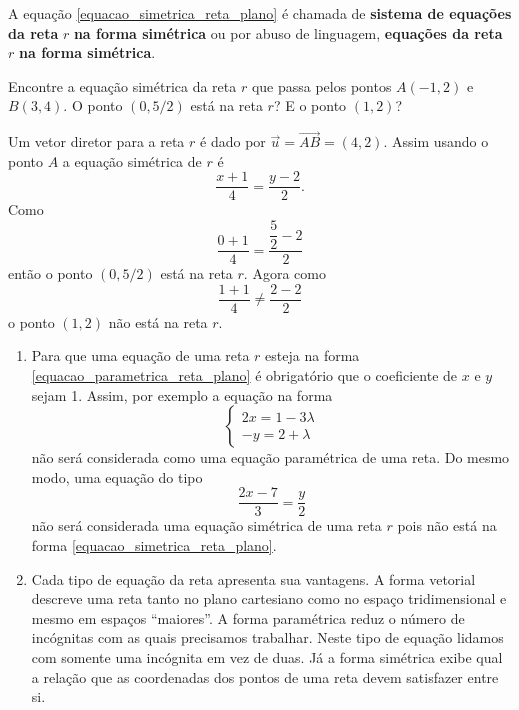 \begin{definicao}
    A equação \eqref{equacao_simetrica_reta_plano} é chamada de \textbf{sistema de equações da reta} $r$ \textbf{na forma simétrica} ou por abuso de linguagem, \textbf{equações da reta} $r$ \textbf{na forma simétrica}.
\end{definicao}

\begin{exemplos}
    Encontre a equação simétrica da reta $r$ que passa pelos pontos $A(-1,2)$ e $B(3,4)$. O ponto $(0,5/2)$ está na reta $r$? E o ponto $(1,2)$?
    \begin{solucao}
        Um vetor diretor para a reta $r$ é dado por $\vec{u} = \vec{AB} = (4,2)$. Assim usando o ponto $A$ a equação simétrica de $r$ é
        \[
            \dfrac{x + 1}{4} = \dfrac{y - 2}{2}.
        \]
        Como
        \[
            \dfrac{0 + 1}{4} = \dfrac{\dfrac{5}{2} - 2}{2}
        \]
        então o ponto $(0,5/2)$ está na reta $r$. Agora como
        \[
            \dfrac{1+1}{4} \ne \dfrac{2 - 2}{2}
        \]
        o ponto $(1, 2)$ não está na reta $r$.

    \end{solucao}
\end{exemplos}

\begin{observacao}
    \begin{enumerate}
        \item Para que uma equação de uma reta $r$ esteja na forma \eqref{equacao_parametrica_reta_plano} é obrigatório que o coeficiente de $x$ e $y$ sejam 1. Assim, por exemplo a equação na forma
              \[
                  \begin{cases}
                      2x = 1 - 3\lambda \\
                      -y = 2 + \lambda
                  \end{cases}
              \]
              não será considerada como uma equação paramétrica de uma reta. Do mesmo modo, uma equação do tipo
              \[
                  \dfrac{2x - 7}{3} = \dfrac{y}{2}
              \]
              não será considerada uma equação simétrica de uma reta $r$ pois não está na forma \eqref{equacao_simetrica_reta_plano}.

        \item Cada tipo de equação da reta apresenta sua vantagens. A forma vetorial descreve uma reta tanto no plano cartesiano como no espaço tridimensional e mesmo em espaços ``maiores''. A forma paramétrica reduz o número de incógnitas com as quais precisamos trabalhar. Neste tipo de equação lidamos com somente uma incógnita em vez de duas. Já a forma simétrica exibe qual a relação que as coordenadas dos pontos de uma reta devem satisfazer entre si.
    \end{enumerate}
\end{observacao}

